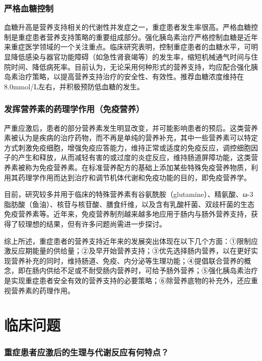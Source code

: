 \subsubsection{严格血糖控制}

血糖升高是营养支持相关的代谢性并发症之一，重症患者发生率很高。严格血糖控制是重症患者营养支持策略的重要组成部分。强化胰岛素治疗严格控制血糖是近年来重症医学领域的一个关注重点。临床研究表明，控制重症患者的血糖水平，可明显降低感染与器官功能障碍（如急性肾衰竭等）的发生率，缩短机械通气时间与住院时间、降低病死率。目前认为，无论采用何种形式的营养支持，均应配合强化胰岛素治疗策略，以提高营养支持治疗的安全性、有效性。推荐血糖浓度维持在8.0mmol/L左右，并积极预防低血糖的发生。

\subsubsection{发挥营养素的药理学作用（免疫营养）}

严重应激后，患者的部分营养素发生明显改变，并可能影响患者的预后。这类营养素被认为是疾病的治疗药物，而不再是单纯的营养补充，其中一些营养素可以特定方式刺激免疫细胞，增强免疫应答能力，维持正常或适度的免疫反应，调控细胞因子的产生和释放，从而减轻有害的或过度的炎症反应，维持肠道屏障功能，这类营养素被称为免疫营养素。在标准营养配方的基础上添加某些特殊免疫营养物质，利用其药理学作用而达到治疗和调节机体代谢和免疫功能的目的，即免疫营养学。

目前，研究较多并用于临床的特殊营养素有谷氨酰胺（glutamine）、精氨酸、ω-3脂肪酸（鱼油）、核苷与核苷酸、膳食纤维，以及含有乳酸杆菌、双歧杆菌的生态免疫营养素等。近年来，免疫营养制剂越来越多地应用于肠内与肠外营养支持，获得了较理想的结果，但有许多问题尚需进一步探讨。

综上所述，重症患者的营养支持近年来的发展突出体现在以下几个方面：①限制应激反应期能量的供给量；②及早开始营养支持；③优先选择肠内营养，以在更好实现营养补充的同时，维持肠道、免疫、内分泌等生理功能；④提倡联合营养的概念，即在肠内供给不足或不耐受肠内营养时，可给予肠外营养；⑤强化胰岛素治疗是实现重症患者安全有效的营养支持的必要策略；⑥除营养底物的补充外，还应重视营养素的药理作用。

\section{临床问题}

\subsubsection{重症患者应激后的生理与代谢反应有何特点？}

